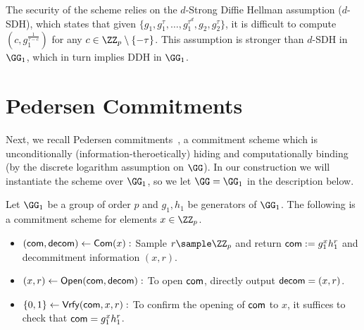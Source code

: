 
The security of the scheme relies on the $d$-Strong Diffie Hellman assumption ($d$-SDH), which states that given $\{g_1, g_1^\tau, \dots, g_1^{\tau^d}, g_2, g_2^\tau\}$, it is difficult to compute $(c, g_1^{\frac{1}{\tau-c}})$ for any $c \in \ZZ_p \setminus \{-\tau\}$. This assumption is stronger than $d$-SDH in $\GG_1$, which in turn implies DDH in $\GG_1$.

\section{Pedersen Commitments}\label{sec:pedersen}

Next, we recall Pedersen commitments~\cite{C:Pedersen91}, a commitment scheme which is unconditionally (information-theroetically) hiding and computationally binding (by the discrete logarithm assumption on $\GG$). In our construction we will instantiate the scheme over $\GG_1$, so we let $\GG = \GG_1$ in the description below.

\begin{construction}
Let $\GG_1$ be a group of order $p$ and $g_1,h_1$ be generators of $\GG_1$. The following is a commitment scheme for elements $x \in \ZZ_p$.
\begin{itemize}
    \item \underline{$(\mathsf{com}, \mathsf{decom}) \gets \mathsf{Com}(x):$} Sample $r \sample \ZZ_p$ and return $\mathsf{com} := g_1^x h_1^r$ and decommitment information $(x, r)$.
    \item \underline{$(x, r) \gets \mathsf{Open}(\mathsf{com}, \mathsf{decom}):$} To open $\mathsf{com}$, directly output $\mathsf{decom} = (x, r)$.
    \item \underline{$\{0,1\} \gets \mathsf{Vrfy}(\mathsf{com}, x, r):$} To confirm the opening of $\mathsf{com}$ to $x$, it suffices to check that $\mathsf{com} = g_1^x h_1^r$.
\end{itemize}
\end{construction}

